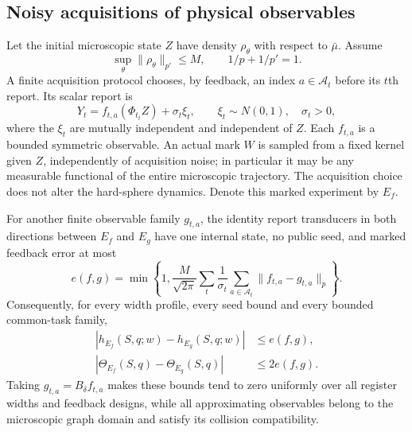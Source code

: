 \subsection{Noisy acquisitions of physical observables}
Let the initial microscopic state $Z$ have density $\rho_\theta$ with
respect to $\bar\mu$. Assume
\begin{equation}
 \sup_\theta\|\rho_\theta\|_{p'}\le M,
 \qquad 1/p+1/p'=1.
 \label{eq:v11-density-bound}
\end{equation}
A finite acquisition protocol chooses, by feedback, an index
$a\in\mathcal A_t$ before its $t$th report. Its scalar report is
\[
 Y_t=f_{t,a}(\Phi_{t_t}Z)+\sigma_t\xi_t,
 \qquad \xi_t\sim N(0,1),\quad\sigma_t>0,
\]
where the $\xi_t$ are mutually independent and independent of $Z$.
Each $f_{t,a}$ is a bounded symmetric observable. An actual mark $W$ is
sampled from a fixed kernel given $Z$, independently of acquisition noise;
in particular it may be any measurable functional of the entire
microscopic trajectory. The acquisition choice does not alter the
hard-sphere dynamics. Denote this marked experiment by $E_f$.

\begin{theorem}
\label{thm:v11-physical-transfer}
For another finite observable family $g_{t,a}$, the identity report
transducers in both directions between $E_f$ and $E_g$ have one internal
state, no public seed, and marked feedback error at most
\begin{equation}
 e(f,g)=\min\left\{1,
    \frac{M}{\sqrt{2\pi}}\sum_t\frac1{\sigma_t}
           \sum_{a\in\mathcal A_t}\|f_{t,a}-g_{t,a}\|_p\right\}.
 \label{eq:v11-physical-error}
\end{equation}
Consequently, for every width profile, every seed bound and every bounded
common-task family,
\begin{align*}
 |h_{E_f}(S,q;w)-h_{E_g}(S,q;w)|&\le e(f,g),\\
 |\Theta_{E_f}(S,q)-\Theta_{E_g}(S,q)|&\le2e(f,g).
\end{align*}
Taking $g_{t,a}=B_\delta f_{t,a}$ makes these bounds tend to zero
uniformly over all register widths and feedback designs, while all
approximating observables belong to the microscopic graph domain and
satisfy its collision compatibility.
\end{theorem}

